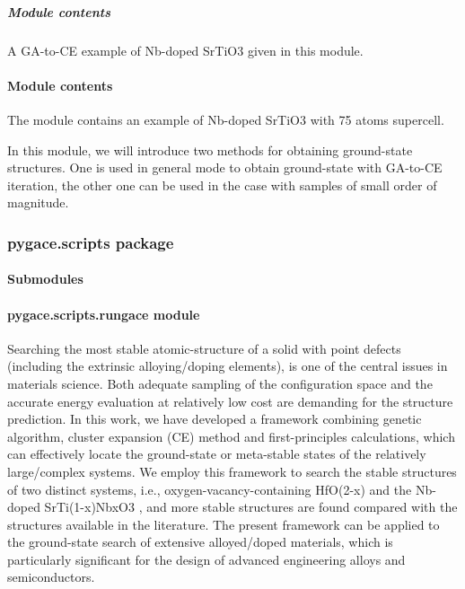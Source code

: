 \documentclass[letterpaper,10pt,english]{sphinxmanual}
\begin{document}
\subparagraph{Module contents}
\label{\detokenize{pygace.examples.sto:module-contents}}\label{\detokenize{pygace.examples.sto:module-pygace.examples.sto}}
A GA-to-CE example of Nb-doped SrTiO3 given in this module.


\paragraph{Module contents}
\label{\detokenize{pygace.examples:module-contents}}\label{\detokenize{pygace.examples:module-pygace.examples}}
The module contains an example of Nb-doped SrTiO3 with 75 atoms supercell.

In this module, we will introduce two methods for obtaining ground-state
structures. One is used in general mode to obtain ground-state with GA-to-CE
iteration, the other one can be used in the case with samples of small
order of magnitude.


\subsubsection{pygace.scripts package}
\label{\detokenize{pygace.scripts:pygace-scripts-package}}\label{\detokenize{pygace.scripts::doc}}

\paragraph{Submodules}
\label{\detokenize{pygace.scripts:submodules}}

\paragraph{pygace.scripts.rungace module}
\label{\detokenize{pygace.scripts:pygace-scripts-rungace-module}}\label{\detokenize{pygace.scripts:module-pygace.scripts.rungace}}
Searching the most stable atomic-structure of a solid with point defects
(including the extrinsic alloying/doping elements), is one of the central issues in
materials science. Both adequate sampling of the configuration space and the
accurate energy evaluation at relatively low cost are demanding for the structure
prediction. In this work, we have developed a framework combining genetic
algorithm, cluster expansion (CE) method and first-principles calculations, which
can effectively locate the ground-state or meta-stable states of the relatively
large/complex systems. We employ this framework to search the stable structures
of two distinct systems, i.e., oxygen-vacancy-containing HfO(2-x) and the
Nb-doped SrTi(1-x)NbxO3 , and more stable structures are found compared with
the structures available in the literature. The present framework can be applied
to the ground-state search of extensive alloyed/doped materials, which is
particularly significant for the design of advanced engineering alloys and
semiconductors.
\end{document}

